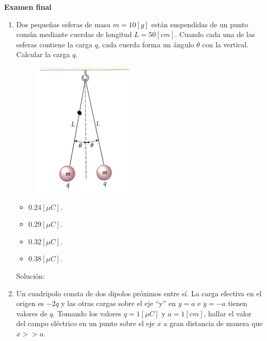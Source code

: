 \documentclass[letter,11pt]{article}
\begin{document}
\begin{center}
    {\Large \bf{Examen final}}
\end{center}

\noindent{}

\vspace{0.5cm}

\begin{enumerate}
\item Dos pequeñas esferas de masa $m = 10 [g]$ están suspendidas de un punto
común mediante cuerdas de longitud $L = 50 [cm]$. Cuando cada una de las esferas
contiene la carga $q$, cada cuerda forma un ángulo $\theta$ con la vertical.
Calcular la carga $q$.

\begin{figure}[!h]
\centering
\includegraphics[scale=2.20]{resources/q1.eps}
\end{figure}

\begin{itemize}
    \item $0.24 [\mu C]$.
    \item $0.29 [\mu C]$.
    \item $0.32 [\mu C]$.
    \item $0.38 [\mu C]$.
\end{itemize}

Solución: \\

\item Un cuadripolo consta de dos dipolos próximos entre sí. La carga efectiva
en el origen es $-2q$ y las otras cargas sobre el eje ``y'' en $y = a$ e
$y = -a$ tienen valores de $q$. Tomando los valores $q = 1 [\mu C]$ y
$a = 1 [cm]$, hallar el valor del campo eléctrico en un punto sobre el eje $x$ a
gran distancia de manera que $x >> a$.


\end{enumerate}
\end{document}
